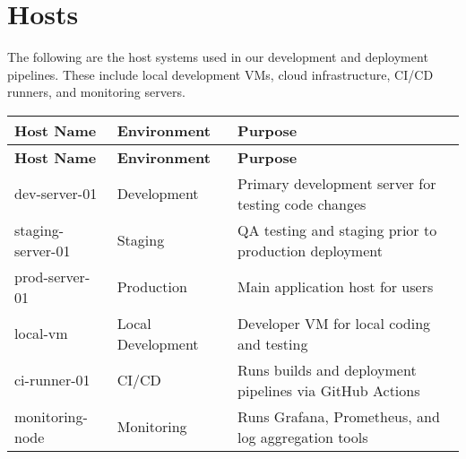 \chapter{Hosts}
\label{ch:hosts}

The following are the host systems used in our development and deployment pipelines. These include local development VMs, cloud infrastructure, CI/CD runners, and monitoring servers.

\begin{longtable}{|p{5cm}|p{4cm}|p{6cm}|}
\hline
\textbf{Host Name} & \textbf{Environment} & \textbf{Purpose} \\
\hline
\endfirsthead

\hline
\textbf{Host Name} & \textbf{Environment} & \textbf{Purpose} \\
\hline
\endhead

dev-server-01 & Development & Primary development server for testing code changes \\
staging-server-01 & Staging & QA testing and staging prior to production deployment \\
prod-server-01 & Production & Main application host for users \\
local-vm & Local Development & Developer VM for local coding and testing \\
ci-runner-01 & CI/CD & Runs builds and deployment pipelines via GitHub Actions \\
monitoring-node & Monitoring & Runs Grafana, Prometheus, and log aggregation tools \\
\hline
\end{longtable}

